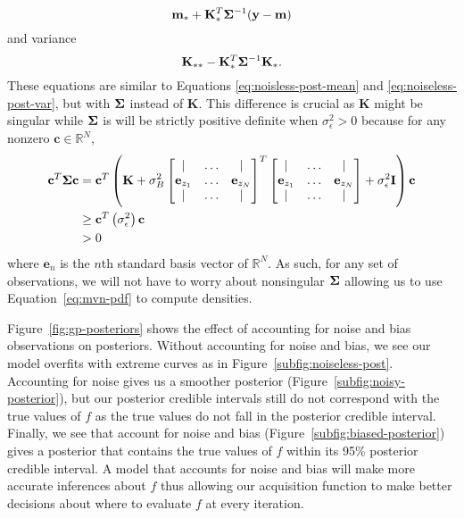 \begin{equation*}
    \mathbf{m}_* + \mathbf{K}_*^T \boldsymbol{\Sigma}^{-1} (\mathbf{y} - \mathbf{m})
\end{equation*}
and variance
\begin{equation*}
    \mathbf{K}_{* *} - \mathbf{K}_*^T \boldsymbol{\Sigma}^{-1} \mathbf{K}_*.
\end{equation*}
These equations are similar to Equations \ref{eq:noisless-post-mean} and \ref{eq:noiseless-post-var}, but with $\boldsymbol{\Sigma}$ instead of $\mathbf{K}$.
This difference is crucial as $\mathbf{K}$ might be singular
while $\boldsymbol{\Sigma}$ is will be strictly positive definite when $\sigma_{\epsilon}^2 > 0$ because
for any nonzero $\mathbf{c} \in \mathbb{R}^{N}$,
\begin{align*}
    \mathbf{c}^{T} \boldsymbol{\Sigma} \mathbf{c}
    &= \mathbf{c}^{T} \left(\mathbf{K} +
    \sigma^2_B
    \begin{bmatrix}
        \vert & \dots & \vert \\
        \mathbf{e}_{z_1} & \dots & \mathbf{e}_{z_N} \\
        \vert & \dots & \vert \\
    \end{bmatrix}
    ^{T}
    \begin{bmatrix}
        \vert & \dots & \vert \\
        \mathbf{e}_{z_1} & \dots & \mathbf{e}_{z_N} \\
        \vert & \dots & \vert \\
    \end{bmatrix}
    + \sigma^2_{\epsilon} \mathbf{I}
    \right) \mathbf{c} \\
    &\geq \mathbf{c}^{T} \left(\sigma_{\epsilon}^{2}\right) \mathbf{c} \\
    & > 0
\end{align*}
where $\mathbf{e}_n$ is the $n$th standard basis vector of $\mathbb{R}^{N}$.
As such, for any set of observations, we will not have to worry about nonsingular $\boldsymbol{\Sigma}$ allowing us to use Equation~\ref{eq:mvn-pdf} to compute densities.

Figure~\ref{fig:gp-posteriors} shows the effect of accounting for noise and bias observations on posteriors.
Without accounting for noise and bias, we see our model overfits with extreme curves as in Figure~\ref{subfig:noiseless-post}.
Accounting for noise gives us a smoother posterior (Figure~\ref{subfig:noisy-posterior}), but our posterior credible intervals still do not correspond with the true values of $f$ as the true values do not fall in the posterior credible interval.
Finally, we see that account for noise and bias (Figure~\ref{subfig:biased-posterior}) gives a posterior that contains the true values of $f$ within its 95\% posterior credible interval.
A model that accounts for noise and bias will make more accurate inferences about $f$ thus allowing our acquisition function to make better decisions about where to evaluate $f$ at every iteration.

